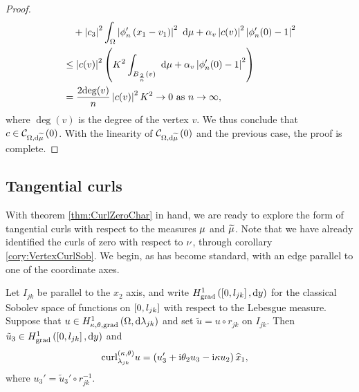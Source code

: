\begin{proof}
\begin{align*}
		&\quad + \left\lvert c_3 \right\rvert^2\int_{\Omega} \left\lvert \phi'_n\left( x_1-v_1 \right) \right\rvert^2  \ \mathrm{d}\mu
		+ \alpha_v\left\lvert c(v) \right\rvert^2\left\lvert \phi'_n(0)-1 \right\rvert^2 \\
		&\leq \left\lvert c(v) \right\rvert^2 \left(  K^2\int_{B_{\frac{2}{n}}(v)}  \ \mathrm{d}\mu
		+ \alpha_v\left\lvert \phi'_n(0)-1 \right\rvert^2  \right) \\
		&= \frac{2\mathrm{deg}(v)}{n}\left\lvert c(v) \right\rvert^2 K^2 \rightarrow 0 \ \text{as} \ n \rightarrow\infty,
	\end{align*}
	where $\mathrm{\deg}(v)$ is the degree of the vertex $v$.
	We thus conclude that $c\in\mathcal{C}_{ \Omega, \mathrm{d}\widetilde{\mu}}\left( 0 \right)$.
	With the linearity of $\mathcal{C}_{ \Omega, \mathrm{d}\widetilde{\mu}}\left( 0 \right)$ and the previous case, the proof is complete.
\end{proof}

\subsection{Tangential curls} \label{ssec:TangCurls}
With theorem \ref{thm:CurlZeroChar} in hand, we are ready to explore the form of tangential curls with respect to the measures $\mu$ and $\widetilde{\mu}$.
Note that we have already identified the curls of zero with respect to $\nu$, through corollary \ref{cory:VertexCurlSob}.
We begin, as has become standard, with an edge parallel to one of the coordinate axes.
\begin{prop} \label{prop:TangCurlEdgeParallel}
	Let $I_{jk}$ be parallel to the $x_2$ axis, and write $H^1_\mathrm{grad}\left( \left[ 0,l_{jk} \right], \mathrm{d}y \right)$ for the classical Sobolev space of functions on $\left[ 0,l_{jk} \right]$ with respect to the Lebesgue measure.
	Suppose that $u\in H^1_{\kappa,\theta,\mathrm{grad}}\left( \Omega, \mathrm{d}\lambda_{jk} \right)$ and set $\tilde{u}=u\circ r_{jk}$ on $I_{jk}$.
	Then $\tilde{u}_3\in H^1_\mathrm{grad}\left( \left[ 0,l_{jk} \right], \mathrm{d}y \right)$ and 
	\begin{align*}
		\mathrm{curl}_{\lambda_{jk}}^{\left( \kappa, \theta \right)}u &= \left(  u_3' + \mathrm{i}\theta_2 u_3 - \mathrm{i}\kappa u_2  \right)\widehat{x}_1,
	\end{align*}
	where $u_3'=\tilde{u}_3'\circ r_{jk}^{-1}$.
\end{prop}

